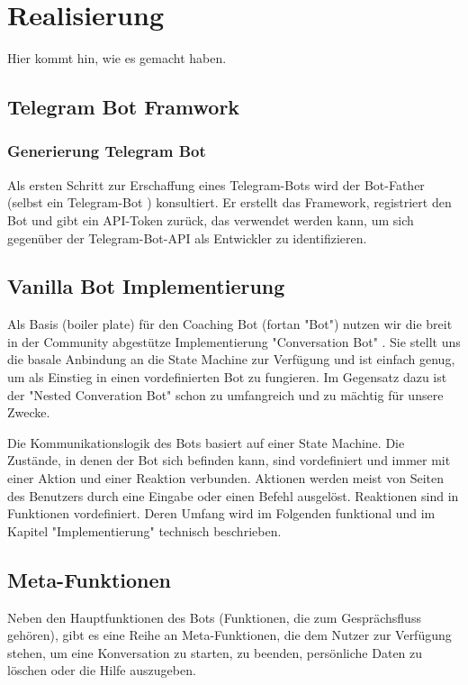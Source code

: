 \chapter{Realisierung}

Hier kommt hin, wie es gemacht haben.  



    \section{Telegram Bot Framwork}

        \subsection{Generierung Telegram Bot}

            Als ersten Schritt zur Erschaffung eines Telegram-Bots wird der Bot-Father (selbst ein Telegram-Bot \cite{coreTelegram}) konsultiert.  Er erstellt das Framework, registriert den Bot und gibt ein API-Token zurück, das verwendet werden kann, um sich gegenüber der Telegram-Bot-API als Entwickler zu identifizieren. \cite{Bot}


        \section{Vanilla Bot Implementierung}
            Als Basis (boiler plate) für den Coaching Bot (fortan "Bot") nutzen wir die breit in der Community abgestütze Implementierung "Conversation Bot" \cite{conversationBot}. Sie stellt uns die basale Anbindung an die State Machine zur Verfügung und ist einfach genug, um als Einstieg in einen vordefinierten Bot zu fungieren. Im Gegensatz dazu ist der "Nested Converation Bot" schon zu umfangreich und zu mächtig für unsere Zwecke.

            Die Kommunikationslogik des Bots basiert auf einer State Machine. Die Zustände, in denen der Bot sich befinden kann, sind vordefiniert und immer mit einer Aktion und einer Reaktion verbunden. Aktionen werden meist von Seiten des Benutzers durch eine Eingabe oder einen Befehl ausgelöst. Reaktionen sind in Funktionen vordefiniert. Deren Umfang wird im Folgenden funktional und im Kapitel "Implementierung" technisch beschrieben.

    
    \section{Meta-Funktionen}
        Neben den Hauptfunktionen des Bots (Funktionen, die zum Gesprächsfluss gehören), gibt es eine Reihe an Meta-Funktionen, die dem Nutzer zur Verfügung stehen, um eine Konversation zu starten, zu beenden, persönliche Daten zu löschen oder die Hilfe auszugeben.

